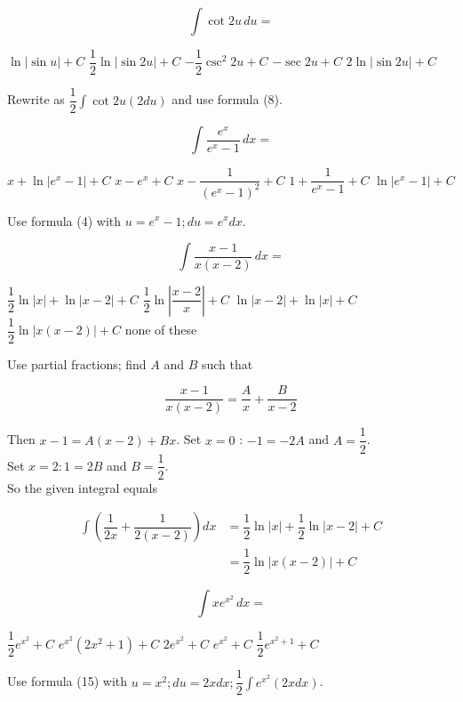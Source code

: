 \newpage


\question
\[
\displaystyle\int \cot 2 u \,du=
\]
\begin{choices}
  \choice $\ln |\sin u|+C$
  \CorrectChoice $\dfrac{1}{2} \ln |\sin 2 u|+C$
  \choice $-\dfrac{1}{2} \csc ^{2} 2 u+C$
  \choice $-\sec 2 u+C$
  \choice $2 \ln |\sin 2 u|+C$
\end{choices}
\begin{solution}
Rewrite as $\dfrac{1}{2} \displaystyle\int \cot 2 u(2 d u)$ and use formula (8).
\end{solution}

\question
\[
\displaystyle\int \dfrac{e^{x}}{e^{x}-1} \,dx=
\]
\begin{choices}
  \choice $x+\ln \left|e^{x}-1\right|+C$
  \choice $x-e^{x}+C$
  \choice $x-\dfrac{1}{\left(e^{x}-1\right)^{2}}+C$
  \choice $1+\dfrac{1}{e^{x}-1}+C$
  \CorrectChoice $\ln \left|e^{x}-1\right|+C$
\end{choices}
\begin{solution}
Use formula (4) with $u=e^{x}-1 ; d u=e^{x} d x$.
\end{solution}



\newpage


\question
\[
\displaystyle\int \dfrac{x-1}{x(x-2)} \,dx=
\]
\begin{choices}
  \choice $\dfrac{1}{2} \ln |x|+\ln |x-2|+C$
  \choice $\dfrac{1}{2} \ln \left|\dfrac{x-2}{x}\right|+C$
  \choice $\ln |x-2|+\ln |x|+C$
  \CorrectChoice $\dfrac{1}{2} \ln |x(x-2)|+C$
  \choice none of these
\end{choices}
\begin{solution}
Use partial fractions; find $A$ and $B$ such that


\[
\dfrac{x-1}{x(x-2)}=\dfrac{A}{x}+\dfrac{B}{x-2}
\]

Then $x-1=A(x-2)+B x$.
Set $x=0$ : $-1=-2 A$ and $A=\dfrac{1}{2}$.\\
Set $x=2: 1=2 B$ and $B=\dfrac{1}{2}$.\\
So the given integral equals

\[
\begin{aligned}
\displaystyle\int\left(\dfrac{1}{2 x}+\dfrac{1}{2(x-2)}\right) d x & =\dfrac{1}{2} \ln |x|+\dfrac{1}{2} \ln |x-2|+C \\
& =\dfrac{1}{2} \ln |x(x-2)|+C
\end{aligned}
\]
\end{solution}

\question
\[
\displaystyle\int x e^{x^{2}} \,dx=
\]
\begin{choices}
  \CorrectChoice $\dfrac{1}{2} e^{x^{2}}+C$
  \choice $e^{x^{2}}\left(2 x^{2}+1\right)+C$
  \choice $2 e^{x^{2}}+C$
  \choice $e^{x^{2}}+C$
  \choice $\dfrac{1}{2} e^{x^{2}+1}+C$
\end{choices}
\begin{solution}
Use formula (15) with $u=x^{2} ; d u=2 x d x ; \dfrac{1}{2} \displaystyle\int e^{x^{2}}(2 x d x)$.
\end{solution}



